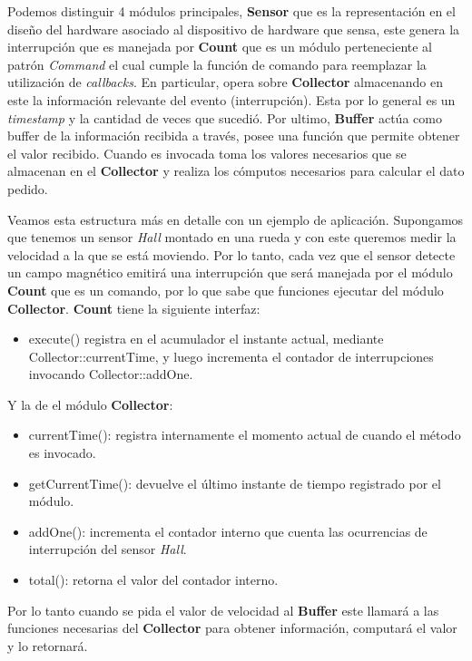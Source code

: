 


Podemos distinguir 4 módulos principales, \textbf{Sensor} que es la representación en el diseño del hardware asociado al dispositivo de hardware que sensa, este genera la interrupción que es manejada por \textbf{Count} que es un módulo perteneciente al patrón \textit{Command} el cual cumple la función de comando para reemplazar la utilización de \textit{callbacks}. En particular, opera sobre \textbf{Collector} almacenando en este la información relevante del evento (interrupción). Esta por lo general es un \textit{timestamp} y la cantidad de veces que sucedió.  Por ultimo, \textbf{Buffer} actúa como buffer de la información recibida a través, posee una función que permite obtener el valor recibido. Cuando es invocada toma los valores necesarios que se almacenan en el \textbf{Collector} y realiza los cómputos necesarios para calcular el dato pedido.

Veamos esta estructura más en detalle con un ejemplo de aplicación. Supongamos que tenemos un sensor \textit{Hall} montado en una rueda y con este queremos medir la velocidad a la que se está moviendo. Por lo tanto, cada vez que el sensor detecte un campo magnético emitirá una interrupción que será manejada por el módulo \textbf{Count} que es un comando, por lo que sabe que funciones ejecutar del módulo \textbf{Collector}. \textbf{Count} tiene la siguiente interfaz:
\begin{itemize}
    \item execute() registra en el acumulador el instante actual, mediante Collector::currentTime, y luego incrementa el contador de interrupciones invocando Collector::addOne.
\end{itemize}

Y la de el módulo \textbf{Collector}:
\begin{itemize}
    \item currentTime(): registra internamente el momento actual de cuando el método es invocado.
    \item getCurrentTime(): devuelve el último instante de tiempo registrado por el módulo.
    \item addOne(): incrementa el contador interno que cuenta las ocurrencias de interrupción del sensor \textit{Hall}.
    \item total(): retorna el valor del contador interno.
\end{itemize}

Por lo tanto cuando se pida el valor de velocidad al \textbf{Buffer} este llamará a las funciones necesarias del \textbf{Collector} para obtener información, computará el valor y lo retornará.

